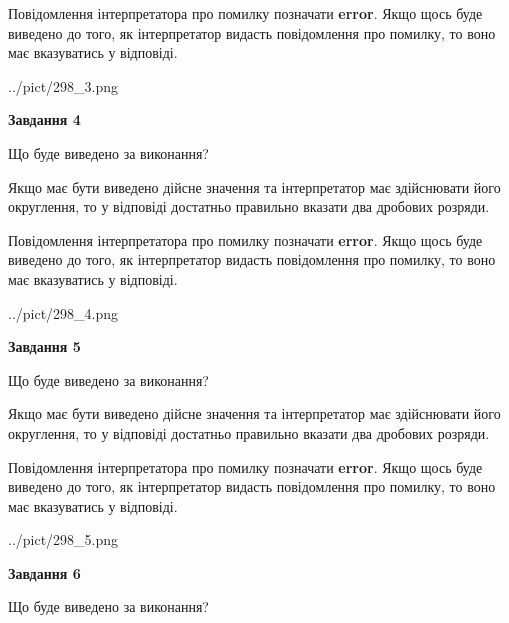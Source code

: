 \documentclass[12pt, ukrainian]{article}
\begin{document}
{\begin {Large}
Повідомлення інтерпретатора про помилку позначати \textbf{error}.
Якщо щось буде виведено до того, як інтерпретатор видасть повідомлення про помилку, 
то воно має вказуватись у відповіді. \par

\begin{center}
	{../pict/298_3.png}
\end{center}
\newpage

{\begin {center}\textbf{Завдання 4}\end {center}}\par
Що буде виведено за виконання? \par

Якщо має бути виведено дійсне значення та інтерпретатор має здійснювати його округлення, 
то у відповіді достатньо правильно вказати два дробових розряди.

Повідомлення інтерпретатора про помилку позначати \textbf{error}.
Якщо щось буде виведено до того, як інтерпретатор видасть повідомлення про помилку, 
то воно має вказуватись у відповіді. \par

\begin{center}
	{../pict/298_4.png}
\end{center}
\newpage

{\begin {center}\textbf{Завдання 5}\end {center}}\par
Що буде виведено за виконання? \par

Якщо має бути виведено дійсне значення та інтерпретатор має здійснювати його округлення, 
то у відповіді достатньо правильно вказати два дробових розряди.

Повідомлення інтерпретатора про помилку позначати \textbf{error}.
Якщо щось буде виведено до того, як інтерпретатор видасть повідомлення про помилку, 
то воно має вказуватись у відповіді. \par

\begin{center}
	{../pict/298_5.png}
\end{center}
\newpage

{\begin {center}\textbf{Завдання 6}\end {center}}\par
Що буде виведено за виконання? \par


\end{Large}}
\end{document}
